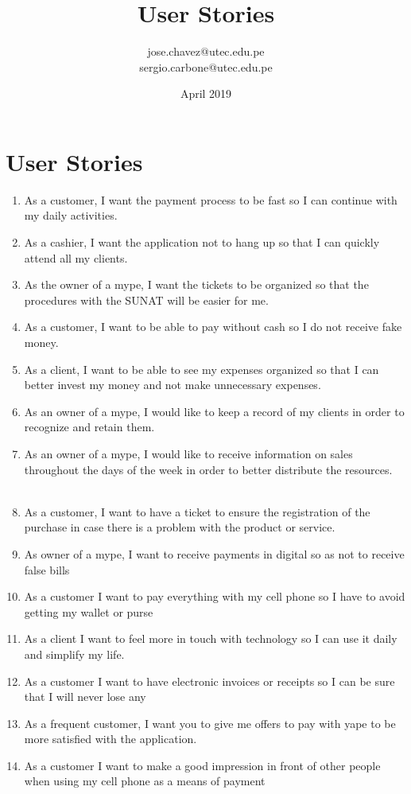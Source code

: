 \documentclass{article}
\title{User Stories}
\author{jose.chavez@utec.edu.pe\\sergio.carbone@utec.edu.pe }
\date{April 2019}
\begin{document}
\maketitle

\section{User Stories}
\begin{enumerate}

    \item As a customer, I want the payment process to be fast so I can continue with my daily activities.
    \item As a cashier, I want the application not to hang up so that I can quickly attend all my clients.
    \item As the owner of a mype, I want the tickets to be organized so that the procedures with the SUNAT will be easier for me.
    \item As a customer, I want to be able to pay without cash so I do not receive fake money.
    \item As a client, I want to be able to see my expenses organized so that I can better invest my money and not make unnecessary expenses.
    \item As an owner of a mype, I would like to keep a record of my clients in order to recognize and retain them.
    \item As an owner of a mype, I would like to receive information on sales throughout the days of the week in order to better distribute the resources.
    \item As a customer, I want to have a ticket to ensure the registration of the purchase in case there is a problem with the product or service.
    \item As owner of a mype, I want to receive payments in digital so as not to receive false bills
    \item As a customer I want to pay everything with my cell phone so I have to avoid getting my wallet or purse
    \item As a client I want to feel more in touch with technology so I can use it daily and simplify my life.
    \item As a customer I want to have electronic invoices or receipts so I can be sure that I will never lose any
   \item As a frequent customer, I want you to give me offers to pay with yape to be more satisfied with the application.
    \item As a customer I want to make a good impression in front of other people when using my cell phone as a means of payment

\end{enumerate}
\end{document}
